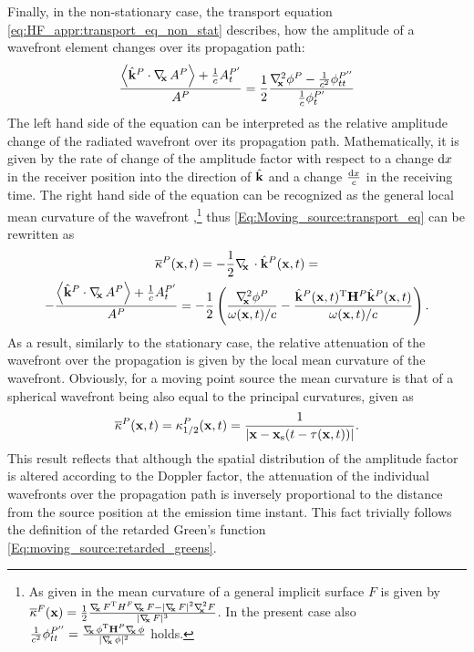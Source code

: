 Finally, in the non-stationary case, the transport equation \eqref{eq:HF_appr:transport_eq_non_stat} describes, how the amplitude of a wavefront element changes over its propagation path:
\begin{equation}
\label{Eq:Moving_source:transport_eq}
\frac{ \left< \hat{\mathbf{k}}^P \cdot \nabla_{\!\!\mathbf{x}}\, A^P \right>+\frac{1}{c} A^{P'}_t }{A^P}  = \frac{1}{2} \frac{ \nabla^2_{\!\!\mathbf{x}} \phi^P - \frac{1}{c^2} \phi^{P''}_{tt} }{\frac{1}{c}\phi^{P'}_t}
\end{equation}
The left hand side of the equation can be interpreted as the relative amplitude change of the radiated wavefront over its propagation path. 
Mathematically, it is given by the rate of change of the amplitude factor with respect to a change $\mathrm{d} x$ in the receiver position into the direction of $\hat{\mathbf{k}}$ and a change $\frac{\mathrm{d} x}{c}$ in the receiving time.
The right hand side of the equation can be recognized as the general local mean curvature of the wavefront \cite[4.2]{Goldman2005},\footnote{As given in \cite{Goldman2005} the mean curvature of a general implicit surface $F$ is given by 
$\overline{\kappa}^F(\vx) = \frac{1}{2}\frac{\Dx F^{\mathrm{T}} H^F \Dx F - |\Dx F|^2 \Lx F }{|\Dx F|^3}$. In the present case also $\frac{1}{c^2} \phi^{P''}_{tt} = \frac{\nabla_{\!\!\mathbf{x}}\, \phi^{\mathrm{T}} \mathbf{H}^P \nabla_{\!\!\mathbf{x}}\, \phi}{|\nabla_{\!\!\mathbf{x}}\, \phi|^2}$ holds.} thus \eqref{Eq:Moving_source:transport_eq} can be rewritten as
\begin{multline}
\overline{\kappa}^P(\mathbf{x},t) = -\frac{1}{2}\nabla_{\!\!\mathbf{x}}\, \cdot \hat{\mathbf{k}}^P(\mathbf{x},t)= \\
-\frac{ \left< \hat{\mathbf{k}}^P \cdot \nabla_{\!\!\mathbf{x}}\, A^P \right>+\frac{1}{c} A^{P'}_t }{A^P} = -\frac{1}{2} \left( \frac{ \nabla^2_{\!\!\mathbf{x}} \phi^P  }{ \omega(\mathbf{x},t)/c } - \frac{ \hat{\mathbf{k}}^P(\mathbf{x},t)^{\mathrm{T}} \mathbf{H}^P \hat{\mathbf{k}}^P(\mathbf{x},t) }{ \omega(\mathbf{x},t)/c } \right).
\label{Eq:Moving_source:attenuation}
\end{multline}
As a result, similarly to the stationary case, the relative attenuation of the wavefront over the propagation is given by the local mean curvature of the wavefront.
Obviously, for a moving point source the mean curvature is that of a spherical wavefront being also equal to the principal curvatures, given as
\begin{equation}
\overline{\kappa}^P(\mathbf{x},t) = \kappa^P_{1/2}(\mathbf{x},t) = \frac{1}{|\mathbf{x}-\mathbf{x}_{\mathrm{s}}(t-\tau(\mathbf{x},t))|}.
\label{Eq:Moving_source:attenuation_2}
\end{equation}
This result reflects that although the spatial distribution of the amplitude factor is altered according to the Doppler factor, the attenuation of the individual wavefronts over the propagation path is inversely proportional to the distance from the source position at the emission time instant.
This fact trivially follows the definition of the retarded Green's function \eqref{Eq:moving_source:retarded_greens}.

